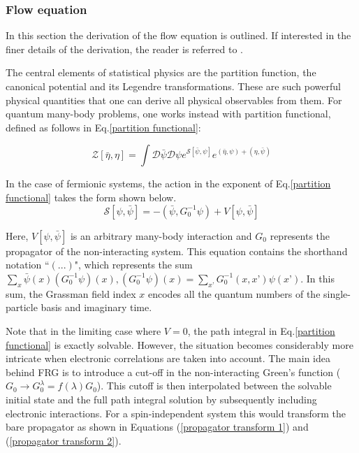 \documentclass[12pt]{article}
\begin{document}
\subsubsection{Flow equation}
\label{subsubsec:Flow Equation}

In this section the derivation of the flow equation is outlined. 
If interested in the finer details of the derivation, the reader is referred to \cite{metzner2012functional}. \par
\medskip
\noindent The central elements of statistical physics are the partition function, the canonical potential and its Legendre transformations. 
These are such powerful physical quantities that one can derive all physical observables from them.
For quantum many-body problems, one works instead with partition functional, defined as follows in Eq.\ref{partition functional}:

\begin{equation}\label{partition functional}
    \mathcal{Z}[\bar{\eta}, \eta] = \int \mathcal{D} \bar{\psi} \mathcal{D}\psi e^{\mathcal{S}[\bar{\psi}, \psi]}e^{(\bar{\eta}, \psi)+(\eta, \bar{\psi})}
\end{equation}

\noindent In the case of fermionic systems, the action in the exponent of Eq.\ref{partition functional} takes the form shown below.
\begin{equation} \label{action}
    \mathcal{S}[\psi, \bar{\psi}] = -(\bar{\psi}, G_0^{-1} \psi) + V[\psi, \bar{\psi}]
\end{equation}

\noindent Here, $V[\psi, \bar{\psi}]$ is an arbitrary many-body interaction and $G_0$ represents the propagator of the non-interacting system. 
This equation contains the shorthand notation ``$(...)$", which represents the sum $\sum_x \bar{\psi}(x)(G_0^{-1}\psi)(x), (G_0^{-1}\psi)(x) = \sum_{x’}G_0^{-1}(x,x’)\psi(x’)$. In this sum, the Grassman field index $x$ encodes all the quantum numbers of the single-particle basis and imaginary time.\par
\medskip

\noindent Note that in the limiting case where $V=0$, the path integral in Eq.\ref{partition functional} is exactly solvable. 
However, the situation becomes considerably more intricate when electronic correlations are taken into account.
The main idea behind FRG is to introduce a cut-off in the non-interacting Green's function ($G_0 \rightarrow G_0^{\lambda} = f(\lambda)G_0$). 
This cutoff is then interpolated between the solvable initial state and the full path integral solution by subsequently including electronic interactions. For a spin-independent system this would transform the 
bare propagator as shown in Equations (\ref{propagator transform 1}) and (\ref{propagator transform 2}). 
\end{document}
